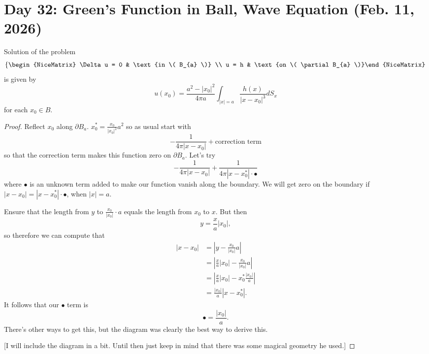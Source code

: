 \section{Day 32: Green's Function in Ball, Wave Equation (Feb. 11, 2026)}

\begin{theorem}
	Solution of the problem
	\[ \left\{\begin{NiceMatrix} \Delta u = 0 & \text{in \( B_{a} \)} \\ u = h & \text{on \( \partial B_{a} \)}\end{NiceMatrix}\right.  \]
	is given by
	\[ u(x_{0}) = \frac{a^{2} - |x_{0}|^{2}}{4 \pi a} \int_{|x| = a} \frac{h(x)}{|x - x_{0}|^{3}} dS_{x}  \]
	for each \( x_{0} \in B \).
\end{theorem}
\begin{proof}
	Reflect \( x_{0} \) along \( \partial B_{a} \). \( x_{0}^{*} = \frac{x_{0}}{|x_{0}|^{2}}a^{2} \) so as usual start with
	\[ - \frac{1}{4 \pi |x - x_{0}|} + \text{correction term} \]
	so that the correction term makes this function zero on \( \partial B_{a} \). Let's try
	\[ - \frac{1}{4 \pi |x - x_{0}|} + \frac{1}{4 \pi |x - x_{0}^{*}| \cdot \bullet} \]
	where \( \bullet \) is an unknown term added to make our function vanish along the boundary. We will get zero on the boundary if \( |x - x_{0}| = |x - x_{0}^{*}| \cdot \bullet \), when \( |x| = a \). 

	

	Ensure that the length from \( y \) to \( \frac{x_{0}}{|x_{0}|} \cdot a \) equals the length from \( x_{0} \) to \( x \). But then
	\[ y = \frac{x}{a} |x_{0}|, \]
	so therefore we can compute that
	\begin{align*}
		|x - x_{0}| &= \left| y - \frac{x_{0}}{|x_{0}|} a \right| \\ 
								&= \left| \frac{x}{a}|x_{0}| - \frac{x_{0}}{|x_{0}|} a \right| \\ 
								&= \left| \frac{x}{a} |x_{0}| - x_{0}^{*} \frac{|x_{0}|}{a} \right| \\
								&= \frac{|x_{0}|}{a} \left| x - x_{0}^{*} \right|.
	\end{align*}
	It follows that our \( \bullet \) term is
	\[ \bullet = \frac{|x_{0}|}{a}. \]
	There's other ways to get this, but the diagram was clearly the best way to derive this.

	[I will include the diagram in a bit. Until then just keep in mind that there was some magical geometry he used.]


\end{proof}
